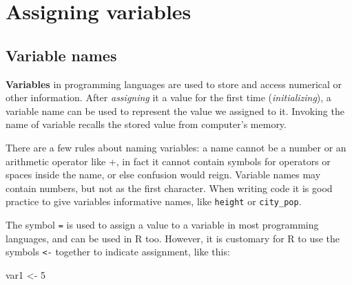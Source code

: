 \documentclass[
  letterpaper,
  DIV=11,
  numbers=noendperiod]{scrreprt}
\newenvironment{Shaded}{\begin{snugshade}}{\end{snugshade}}
\newcommand{\NormalTok}[1]{\textcolor[rgb]{0.00,0.23,0.31}{#1}}
\begin{document}
\hypertarget{assigning-variables}{%
\section*{Assigning variables}\label{assigning-variables}}


\hypertarget{variable-names}{%
\subsection*{Variable names}\label{variable-names}}

\begin{tcolorbox}[enhanced jigsaw, arc=.35mm, colframe=quarto-callout-note-color-frame, left=2mm, opacitybacktitle=0.6, breakable, title=\textcolor{quarto-callout-note-color}{\faInfo}\hspace{0.5em}{Variables}, toprule=.15mm, coltitle=black, bottomtitle=1mm, toptitle=1mm, colback=white, leftrule=.75mm, colbacktitle=quarto-callout-note-color!10!white, titlerule=0mm, opacityback=0, rightrule=.15mm, bottomrule=.15mm]

\textbf{Variables} in programming languages are used to store and access
numerical or other information. After \emph{assigning} it a value for
the first time (\emph{initializing}), a variable name can be used to
represent the value we assigned to it. Invoking the name of variable
recalls the stored value from computer's memory.

\end{tcolorbox}

There are a few rules about naming variables: a name cannot be a number
or an arithmetic operator like +, in fact it cannot contain symbols for
operators or spaces inside the name, or else confusion would reign.
Variable names may contain numbers, but not as the first character. When
writing code it is good practice to give variables informative names,
like \texttt{height} or \texttt{city\_pop}.

The symbol \texttt{=} is used to assign a value to a variable in most
programming languages, and can be used in R too. However, it is
customary for R to use the symbols \texttt{\textless{}-} together to
indicate assignment, like this:

\begin{Shaded}
\begin{Highlighting}[]
\NormalTok{var1 \textless{}{-} 5}
\end{Highlighting}
\end{Shaded}
\end{document}
